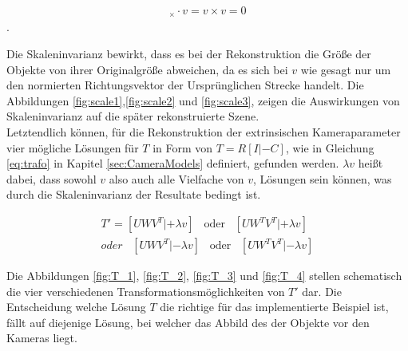 
\begin{gather}
[C'_\delta]_\times \cdot v = v \times v = 0
\end{gather} 
.

Die Skaleninvarianz bewirkt, dass es bei der Rekonstruktion die Größe der Objekte von ihrer Originalgröße abweichen, da es sich bei $v$ wie gesagt nur um den normierten Richtungsvektor der Ursprünglichen Strecke handelt. Die Abbildungen \ref{fig:scale1},\ref{fig:scale2} und \ref{fig:scale3}, zeigen die Auswirkungen von Skaleninvarianz auf die später rekonstruierte Szene. \\

Letztendlich können, für die Rekonstruktion der extrinsischen Kameraparameter vier mögliche Lösungen für $T$ in Form von $T = R[I|-C]$, wie in Gleichung \ref{eq:trafo} in Kapitel \ref{sec:CameraModels} definiert, gefunden werden\cite{HZ,Ferid,phdextrinsicPara}. $\lambda v$ heißt dabei, dass sowohl $v$ also auch alle Vielfache von $v$, Lösungen sein können, was durch die Skaleninvarianz der Resultate bedingt ist\cite{HZ,Ferid,phdextrinsicPara}. 

\begin{gather}
T' = [UWV^T|+\lambda v] \;\;\; \text{oder} \;\;\;[UW^TV^T|+\lambda v]\\
\textit{oder}\;\;\; [UWV^T|-\lambda v] \;\;\; \text{oder} \;\;\;[UW^TV^T|-\lambda v]
\end{gather}

Die Abbildungen \ref{fig:T_1}, \ref{fig:T_2}, \ref{fig:T_3} und \ref{fig:T_4} stellen schematisch die vier verschiedenen Transformationsmöglichkeiten von $T'$ dar.  Die Entscheidung welche Lösung $T$ die richtige für das implementierte Beispiel ist, fällt auf diejenige Lösung, bei welcher das Abbild des der Objekte vor den Kameras liegt.\\\\


